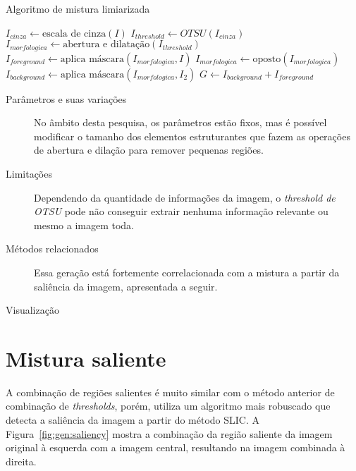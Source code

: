\vspace{0.5cm}
\begin{algorithm}[H]
  \caption{Algoritmo de mistura limiarizada}
  \label{alg:threshold}
  \SetAlgoLined

  $I_{cinza} \gets \text{escala de cinza}(I)$\;
  $I_{threshold} \gets OTSU(I_{cinza})$\;
  $I_{morfologica} \gets \text{abertura e dilatação} (I_{threshold})$\;
  $I_{foreground} \gets \text{aplica máscara}(I_{morfologica}, I) $\;
  $I_{morfologica} \gets \text{oposto}(I_{morfologica})$\;
  $I_{background} \gets \text{aplica máscara}(I_{morfologica}, I_2) $\;
  $G \gets I_{background} + I_{foreground}$\;
\end{algorithm}
\vspace{0.5cm}

\begin{description}
  \item[Parâmetros e suas variações] No âmbito desta pesquisa, os parâmetros estão fixos, mas é possível modificar o tamanho dos elementos estruturantes que fazem as operações de abertura e dilação para remover pequenas regiões.

  \item[Limitações] Dependendo da quantidade de informações da imagem, o \textit{threshold de OTSU} pode não conseguir extrair nenhuma informação relevante ou mesmo a imagem toda.

  \item[Métodos relacionados] Essa geração está fortemente correlacionada com a mistura a partir da saliência da imagem, apresentada a seguir.

  \item[Visualização]
\end{description}
\section{Mistura saliente}

A combinação de regiões salientes é muito similar com o método anterior de combinação de \textit{thresholds}, porém, utiliza um algoritmo mais robuscado que detecta a saliência da imagem a partir do método SLIC. A Figura~\ref{fig:gen:saliency} mostra a combinação da região saliente da imagem original à esquerda com a imagem central, resultando na imagem combinada à direita.

